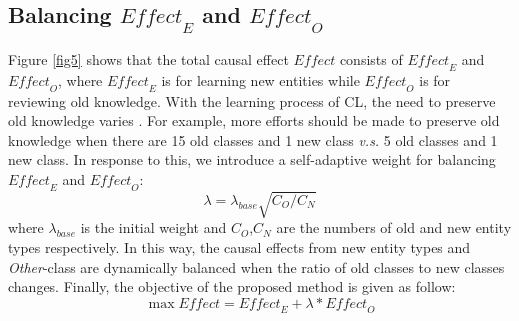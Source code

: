 \documentclass[11pt]{article}
\begin{document}
\subsection{Balancing $\textit{Effect}_E$ and $\textit{Effect}_O$ \label{subsec:4.4}}
Figure \ref{fig5} shows that the total causal effect $\textit{Effect}$ consists of $\textit{Effect}_E$ and $\textit{Effect}_O$, where $\textit{Effect}_E$ is for learning new entities while $\textit{Effect}_O$ is for reviewing old knowledge.
With the learning process of CL, the need to preserve old knowledge varies \citep{hou2019learning}.
For example, more efforts should be made to preserve old knowledge when there are 15 old classes and 1 new class \textit{v.s.} 5 old classes and 1 new class.
In response to this, we introduce a self-adaptive weight for balancing $\textit{Effect}_E$ and $\textit{Effect}_O$:
\begin{equation}
    \lambda = \lambda_{base}\sqrt{C_O/C_N}
\end{equation}
where $\lambda_{base}$ is the initial weight and $C_O$,$C_N$ are the numbers of old and new entity types respectively.
In this way, the causal effects from new entity types and \textit{Other}-class are dynamically balanced when the ratio of old classes to new classes changes.
Finally, the objective of the proposed method is given as follow:
\begin{equation}
    \max \textit{Effect} = \textit{Effect}_E + \lambda * \textit{Effect}_O
\end{equation}
\end{document}
